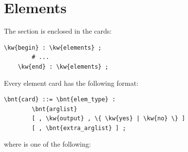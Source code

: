 \chapter{Elements}\label{sec:ELEMENTS}
The  section is enclosed in the cards:
\begin{Verbatim}[commandchars=\\\{\}]
    \kw{begin} : \kw{elements} ;
        # ...
    \kw{end} : \kw{elements} ;
\end{Verbatim}
Every element card has the following format:
\begin{Verbatim}[commandchars=\\\{\}]
    \bnt{card} ::= \bnt{elem_type} :
        \bnt{arglist}
        [ , \kw{output} , \{ \kw{yes} | \kw{no} \} ] 
        [ , \bnt{extra_arglist} ] ;
\end{Verbatim}
where  is one of the following:
